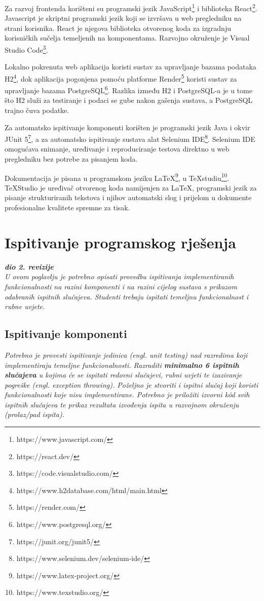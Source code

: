 			Za razvoj frontenda korišteni su programski jezik JavaScript\footnote{https://www.javascript.com/} i biblioteka React\footnote{https://react.dev/}. Javascript je skriptni programski jezik koji se izvršava u web pregledniku na strani korisnika. React je njegova biblioteka otvorenog koda za izgradnju korisničkih sučelja temeljenih na komponentama. Razvojno okruženje je Visual Studio Code\footnote{https://code.visualstudio.com/}. 
			
			Lokalno pokrenuta web aplikacija koristi sustav za upravljanje bazama podataka H2\footnote{https://www.h2database.com/html/main.html}, dok aplikacija pogonjena pomoću platforme Render\footnote{https://render.com/} koristi sustav za upravljanje bazama PostgreSQL\footnote{https://www.postgresql.org/}. Razlika između H2 i PostgreSQL-a je u tome što H2 služi za testiranje i podaci se gube nakon gašenja sustava, a PostgreSQL trajno čuva podatke. 
			
			Za automatsko ispitivanje komponenti korišten je programski jezik Java i okvir JUnit 5\footnote{https://junit.org/junit5/}, a za automatsko ispitivanje sustava alat Selenium IDE\footnote{https://www.selenium.dev/selenium-ide/}. Selenium IDE omogućava snimanje, uređivanje i reproduciranje testova direktno u web pregledniku bez potrebe za pisanjem koda.
			
			Dokumentacija je pisana u programskom jeziku LaTeX\footnote{https://www.latex-project.org/}, u TeXstudiu\footnote{https://www.texstudio.org/}. TeXStudio je uređivač otvorenog koda namijenjen za LaTeX, programski jezik za pisanje strukturiranih tekstova i njihov automatski slog i prijelom u dokumente profesionalne kvalitete spremne za tisak.
						 
			
			\eject 
		
	
		\section{Ispitivanje programskog rješenja}
			
			\textbf{\textit{dio 2. revizije}}\\
			
			 \textit{U ovom poglavlju je potrebno opisati provedbu ispitivanja implementiranih funkcionalnosti na razini komponenti i na razini cijelog sustava s prikazom odabranih ispitnih slučajeva. Studenti trebaju ispitati temeljnu funkcionalnost i rubne uvjete.}
	
			
			\subsection{Ispitivanje komponenti}
			\textit{Potrebno je provesti ispitivanje jedinica (engl. unit testing) nad razredima koji implementiraju temeljne funkcionalnosti. Razraditi \textbf{minimalno 6 ispitnih slučajeva} u kojima će se ispitati redovni slučajevi, rubni uvjeti te izazivanje pogreške (engl. exception throwing). Poželjno je stvoriti i ispitni slučaj koji koristi funkcionalnosti koje nisu implementirane. Potrebno je priložiti izvorni kôd svih ispitnih slučajeva te prikaz rezultata izvođenja ispita u razvojnom okruženju (prolaz/pad ispita). }
			

